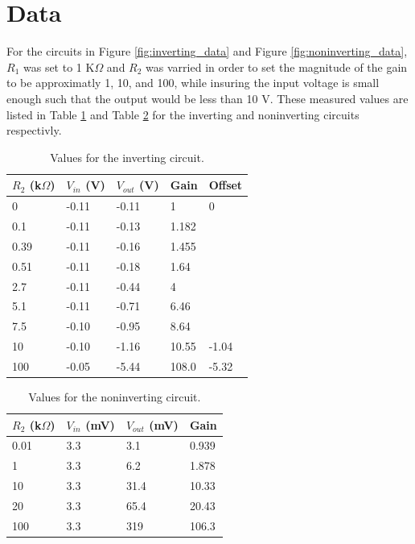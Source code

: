 \documentclass[11pt,onecolumn]{article}
\begin{document}
\section{Data}\label{sec:Data}
For the circuits in Figure \ref{fig:inverting_data} and Figure \ref{fig:noninverting_data}, $R_1$ was set to 1 K$\Omega$ and $R_2$ was varried in order to set the magnitude of the gain to be approximatly 1, 10, and 100, while insuring the input voltage is small enough such that the output would be less than 10 V. These measured values are listed in Table \ref{tab:Q1_inverting} and Table \ref{tab:Q1_noninverting} for the inverting and noninverting circuits respectivly.
\begin{table}
\center
\begin{tabular}{|lllll|}
\hline
$R_2$ (k$\Omega$)& $V_{in}$ (V)	& $V_{out}$ (V)	& Gain	& Offset \\
\hline
0		& -0.11		& -0.11		& 1	& 0 \\
0.1		& -0.11		& -0.13		& 1.182	& \\
0.39		& -0.11		& -0.16		& 1.455	& \\
0.51		& -0.11		& -0.18		& 1.64	& \\
2.7		& -0.11		& -0.44		& 4	& \\
5.1		& -0.11		& -0.71		& 6.46	& \\
7.5		& -0.10		& -0.95		& 8.64	& \\
10		& -0.10		& -1.16		& 10.55	& -1.04 \\
100		& -0.05		& -5.44		& 108.0	& -5.32 \\
\hline
\end{tabular}
\caption{Values for the inverting circuit.}\label{tab:Q1_inverting}
\end{table}

\begin{table}
\center
\begin{tabular}{|llll|}
\hline
$R_2$ (k$\Omega$)& $V_{in}$ (mV)& $V_{out}$ (mV)& Gain	\\
\hline
0.01		& 3.3		& 3.1		& 0.939 \\
1		& 3.3		& 6.2		& 1.878 \\
10		& 3.3		& 31.4		& 10.33 \\
20		& 3.3		& 65.4		& 20.43 \\
100		& 3.3		& 319		& 106.3 \\
\hline
\end{tabular}
\caption{Values for the noninverting circuit.}\label{tab:Q1_noninverting}
\end{table}
\end{document}
